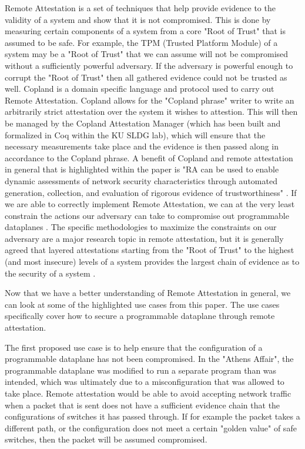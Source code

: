\documentclass[12pt]{article}
\begin{document}
    Remote Attestation is a set of techniques that help provide evidence to the validity of a system and show that it is not compromised. This is done by measuring certain components of a system from a core "Root of Trust" that is assumed to be safe. For example, the TPM (Trusted Platform Module) of a system may be a "Root of Trust" that we can assume will not be compromised without a sufficiently powerful adversary. If the adversary is powerful enough to corrupt the "Root of Trust" then all gathered evidence could not be trusted as well. Copland is a domain specific language and protocol used to carry out Remote Attestation. \cite{cop_tutor} Copland allows for the "Copland phrase" writer to write an arbitrarily strict attestation over the system it wishes to attestion. This will then be managed by the Copland Attestation Manager (which has been built and formalized in Coq within the KU SLDG lab), which will ensure that the necessary measurements take place and the evidence is then passed along in accordance to the Copland phrase. A benefit of Copland and remote attestation in general that is highlighted within the paper is "RA can be used to enable dynamic assessments of network security characteristics through automated generation, collection, and evaluation of rigorous evidence of trustworthiness" \cite{prog_data}. If we are able to correctly implement Remote Attestation, we can at the very least constrain the actions our adversary can take to compromise out programmable dataplanes \cite{confining}. The specific methodologies to maximize the constraints on our adversary are a major research topic in remote attestation, but it is generally agreed that layered attestations starting from the "Root of Trust" to the highest (and most insecure) levels of a system provides the largest chain of evidence as to the security of a system \cite{layered_attest}. 

    Now that we have a better understanding of Remote Attestation in general, we can look at some of the highlighted use cases from this paper. The use cases specifically cover how to secure a programmable dataplane through remote attestation. 
    
    The first proposed use case is to help ensure that the configuration of a programmable dataplane has not been compromised. In the "Athens Affair", the programmable dataplane was modified to run a separate program than was intended, which was ultimately due to a misconfiguration that was allowed to take place. Remote attestation would be able to avoid accepting network traffic when a packet that is sent does not have a sufficient evidence chain that the configurations of switches it has passed through. If for example the packet takes a different path, or the configuration does not meet a certain "golden value" of safe switches, then the packet will be assumed compromised. 
\end{document}
